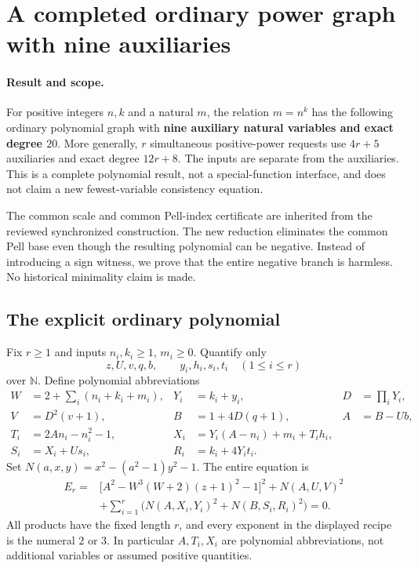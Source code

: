 \section{A completed ordinary power graph with nine auxiliaries}
\label{sec:signed-power-frame}

\paragraph{Result and scope.}
For positive integers $n,k$ and a natural $m$, the relation $m=n^k$
has the following ordinary polynomial graph with \textbf{nine auxiliary
natural variables and exact degree $20$}. More generally, $r$ simultaneous
positive-power requests use $4r+5$ auxiliaries and exact degree $12r+8$.
The inputs are separate from the auxiliaries. This is a complete polynomial
result, not a special-function interface, and does not claim a new
fewest-variable consistency equation.

The common scale and common Pell-index certificate are inherited from the
reviewed synchronized construction. The new reduction eliminates the common
Pell base even though the resulting polynomial can be negative. Instead of
introducing a sign witness, we prove that the entire negative branch is
harmless. No historical minimality claim is made.

\subsection{The explicit ordinary polynomial}
Fix $r\geq1$ and inputs $n_i,k_i\geq1$, $m_i\geq0$. Quantify only
\[
 z,U,v,q,b,\qquad y_i,h_i,s_i,t_i\quad(1\leq i\leq r)
\]
over $\mathbb N$. Define polynomial abbreviations
\begin{align*}
 W&=2+\sum_i(n_i+k_i+m_i),&Y_i&=k_i+y_i,&D&=\prod_iY_i,\\
 V&=D^2(v+1),&B&=1+4D(q+1),&A&=B-Ub,\\
 T_i&=2An_i-n_i^2-1,&X_i&=Y_i(A-n_i)+m_i+T_i h_i,\\
 S_i&=X_i+Us_i,&R_i&=k_i+4Y_it_i.
\end{align*}
Set $N(a,x,y)=x^2-(a^2-1)y^2-1$. The entire equation is
\begin{equation}
\boxed{\begin{aligned}
E_r={}&\bigl[A^2-W^3(W+2)(z+1)^2-1\bigr]^2+N(A,U,V)^2\\
&+\sum_{i=1}^r\bigl(N(A,X_i,Y_i)^2+N(B,S_i,R_i)^2\bigr)=0.
\end{aligned}}
\label{eq:signed-power}
\end{equation}
All products have the fixed length $r$, and every exponent in the displayed
recipe is the numeral $2$ or $3$. In particular $A,T_i,X_i$ are polynomial
abbreviations, not additional variables or assumed positive quantities.

